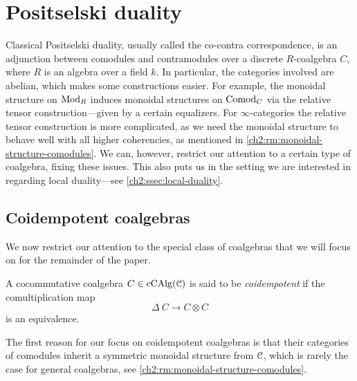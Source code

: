 
\section{Positselski duality}
\label{ch2:sec:positselski-duality}

Classical Positselski duality, usually called the co-contra correspondence, is an adjunction between comodules and contramodules over a discrete $R$-coalgebra $C$, where $R$ is an algebra over a field $k$. In particular, the categories involved are abelian, which makes some constructions easier. For example, the monoidal structure on $\mathrm{Mod}_R$ induces monoidal structures on $\mathrm{Comod}_C$ via the relative tensor construction---given by a certain equalizers. For $\infty$-categories the relative tensor construction is more complicated, as we need the monoidal structure to behave well with all higher coherencies, as mentioned in \cref{ch2:rm:monoidal-structure-comodules}. We can, however, restrict our attention to a certain type of coalgebra, fixing these issues. This also puts us in the setting we are interested in regarding local duality---see \cref{ch2:ssec:local-duality}. 

\subsection{Coidempotent coalgebras}
\label{ch2:ssec:coidempotent-coalgebras}

We now restrict our attention to the special class of coalgebras that we will focus on for the remainder of the paper. 

\begin{definition}
    A cocommutative coalgebra $C\in \operatorname{cCAlg}(\EuScript{C})$ is said to be \emph{coidempotent} if the comultiplication map 
    \[\Delta\: C\to C\otimes C\] 
    is an equivalence. 
\end{definition}


The first reason for our focus on coidempotent coalgebras is that their categories of comodules inherit a symmetric monoidal structure from $\EuScript{C}$, which is rarely the case for general coalgebras, see \cref{ch2:rm:monoidal-structure-comodules}. 

